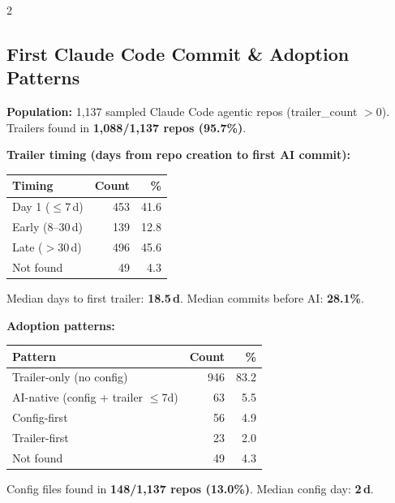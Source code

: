 \documentclass[10pt,a4paper]{article}
\begin{document}
\begin{multicols}{2}
\footnotesize

\subsection*{First Claude Code Commit \& Adoption Patterns}
\textbf{Population:} 1,137 sampled Claude Code agentic repos (trailer\_count $> 0$).\\
Trailers found in \textbf{1,088/1,137 repos (95.7\%)}.

\vspace{3pt}
\textbf{Trailer timing (days from repo creation to first AI commit):}

\vspace{2pt}
\begin{tabular}{@{}lrr@{}}
\toprule
Timing & Count & \% \\
\midrule
Day 1 ($\leq$7\,d)  & 453 & 41.6 \\
Early (8--30\,d)    & 139 & 12.8 \\
Late ($>$30\,d)     & 496 & 45.6 \\
Not found           &  49 &  4.3 \\
\bottomrule
\end{tabular}

\vspace{2pt}
Median days to first trailer: \textbf{18.5\,d}.\quad
Median commits before AI: \textbf{28.1\%}.

\columnbreak

\textbf{Adoption patterns:}

\vspace{2pt}
\begin{tabular}{@{}lrr@{}}
\toprule
Pattern & Count & \% \\
\midrule
Trailer-only (no config)        &   946 & 83.2 \\
AI-native (config + trailer $\leq$7d) &  63 &  5.5 \\
Config-first                    &    56 &  4.9 \\
Trailer-first                   &    23 &  2.0 \\
Not found                       &    49 &  4.3 \\
\bottomrule
\end{tabular}

\vspace{2pt}
Config files found in \textbf{148/1,137 repos (13.0\%)}.\;
Median config day: \textbf{2\,d}.


\end{multicols}
\end{document}
